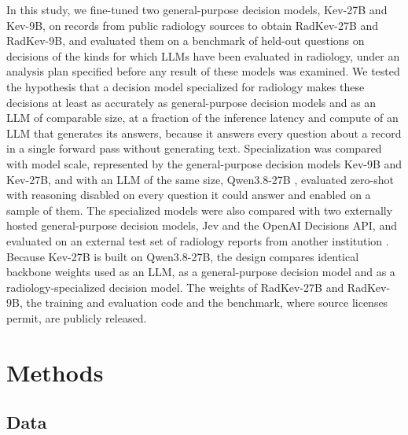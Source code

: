 \documentclass[11pt]{article}
\begin{document}
In this study, we fine-tuned two general-purpose decision models, Kev-27B and Kev-9B, on  records from public radiology sources to obtain RadKev-27B and RadKev-9B, and evaluated them on a benchmark of  held-out questions on decisions of the kinds for which LLMs have been evaluated in radiology, under an analysis plan specified before any result of these models was examined. We tested the hypothesis that a decision model specialized for radiology makes these decisions at least as accurately as general-purpose decision models and as an LLM of comparable size, at a fraction of the inference latency and compute of an LLM that generates its answers, because it answers every question about a record in a single forward pass without generating text. Specialization was compared with model scale, represented by the general-purpose decision models Kev-9B and Kev-27B, and with an LLM of the same size, Qwen3.8-27B \citep{qwen38}, evaluated zero-shot with reasoning disabled on every question it could answer and enabled on a sample of them. The specialized models were also compared with two externally hosted general-purpose decision models, Jev and the OpenAI Decisions API, and evaluated on an external test set of radiology reports from another institution \citep{delbrouck2024radgraphxl}. Because Kev-27B is built on Qwen3.8-27B, the design compares identical backbone weights used as an LLM, as a general-purpose decision model and as a radiology-specialized decision model. The weights of RadKev-27B and RadKev-9B, the training and evaluation code and the benchmark, where source licenses permit, are publicly released.

\section{Methods}

\subsection{Data}\label{sec:data}
\end{document}

